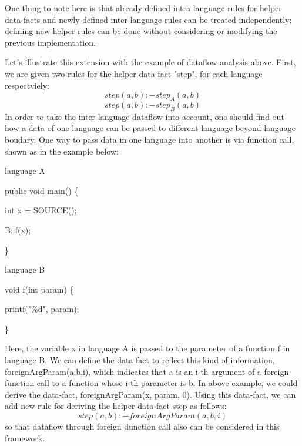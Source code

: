 One thing to note here is that already-defined intra language rules for helper
data-facts and newly-defined inter-language rules can be treated independently;
defining new helper rules can be done without considering or modifying the 
previous implementation.

Let's illustrate this extension with the example of dataflow analysis above.
First, we are given two rules for the helper data-fact "step", for each language
respectviely:
\[step(a,b) :- step_A(a,b)\]
\[step(a,b) :- step_B(a,b)\]
In order to take the inter-language dataflow into account, one should find out
how a data of one language can be passed to different language beyond language
boudary.  One way to pass data in one language into another is via function
call, shown as in the example below:

language A

public void main() \{

\quad int x = SOURCE();

\quad B::f(x);

\}

language B

void f(int param) \{

\quad printf("\%d", param);

\}

Here, the variable x in language A is passed to the parameter of a function f
in language B. We can define the data-fact to reflect this kind of information,
foreignArgParam(a,b,i), which indicates that a is an i-th argument of a foreign
function call to a function whose i-th parameter is b. In above example, we
could derive the data-fact, foreignArgParam(x, param, 0). Using this data-fact,
we can add new rule for deriving the helper data-fact step as follows:
\[step(a,b) :- foreignArgParam(a,b,i)\]
so that dataflow through foreign dunction call also can be considered in this
framework.
